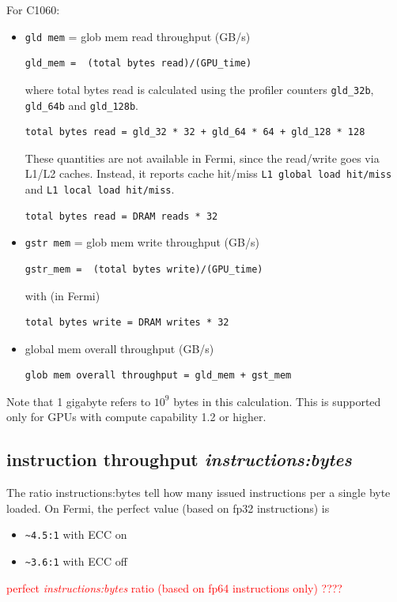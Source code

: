 For C1060:
\begin{itemize}
\item \verb!gld mem! = glob mem read throughput (GB/s)
\begin{verbatim}
gld_mem =  (total bytes read)/(GPU_time) 
\end{verbatim}
  where total bytes read is calculated using the profiler counters
  \verb!gld_32b!, \verb!gld_64b! and \verb!gld_128b!. 
\begin{verbatim}
total bytes read = gld_32 * 32 + gld_64 * 64 + gld_128 * 128
\end{verbatim}
  These quantities are not available in Fermi, since the read/write
  goes via L1/L2 caches. Instead, it reports cache hit/miss
  \verb!L1 global load hit/miss! and \verb!L1 local load hit/miss!.
\begin{verbatim}
total bytes read = DRAM reads * 32
\end{verbatim}

\item \verb!gstr mem! = glob mem write throughput (GB/s)
\begin{verbatim}
gstr_mem =  (total bytes write)/(GPU_time) 
\end{verbatim}
with (in Fermi)
\begin{verbatim}
total bytes write = DRAM writes * 32
\end{verbatim}

\item global mem overall throughput (GB/s)
\begin{verbatim}
glob mem overall throughput = gld_mem + gst_mem
\end{verbatim}
\end{itemize}

Note that 1 gigabyte refers to $10^9$ bytes in this calculation. This
is supported only for GPUs with compute capability 1.2 or higher.

\subsection{instruction throughput {\it instructions:bytes}}
\label{sec:instructions:bytes}

The ratio instructions:bytes tell how many issued instructions per a
single byte loaded. On Fermi, the perfect value (based on fp32
instructions) is
\begin{itemize}
\item \verb!~4.5:1! with ECC on
\item \verb!~3.6:1! with ECC off
\end{itemize}
\textcolor{red}{ perfect {\it instructions:bytes} ratio (based on fp64
  instructions only) ???? }

